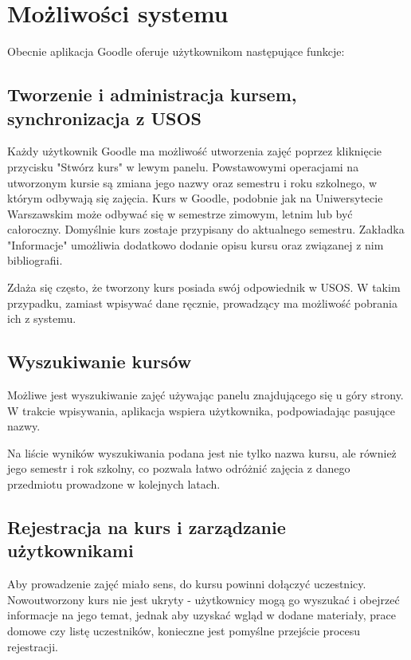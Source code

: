 \documentclass{pracamgr}
\begin{document}
%
%
\chapter{Możliwości systemu}

Obecnie aplikacja Goodle oferuje użytkownikom następujące funkcje:

\section{Tworzenie i administracja kursem, synchronizacja z USOS}

Każdy użytkownik Goodle ma możliwość utworzenia zajęć poprzez kliknięcie
przycisku "Stwórz kurs" w lewym panelu. Powstawowymi operacjami na 
utworzonym kursie są zmiana jego nazwy oraz semestru i roku szkolnego, 
w którym odbywają się zajęcia. Kurs w Goodle, podobnie jak na Uniwersytecie
Warszawskim może odbywać się w semestrze zimowym, letnim lub być całoroczny.
Domyślnie kurs zostaje przypisany do aktualnego semestru.
Zakładka "Informacje" umożliwia dodatkowo dodanie opisu kursu oraz związanej
z nim bibliografii.

Zdaża się często, że tworzony kurs posiada swój odpowiednik w USOS. W takim
przypadku, zamiast wpisywać dane ręcznie, prowadzący ma możliwość pobrania
ich z systemu.

\section{Wyszukiwanie kursów}

Możliwe jest wyszukiwanie zajęć używając panelu znajdującego
się u góry strony. W trakcie wpisywania, aplikacja wspiera użytkownika,
podpowiadając pasujące nazwy. 

Na liście wyników wyszukiwania podana jest nie tylko nazwa kursu, 
ale również jego semestr i rok szkolny, co pozwala łatwo odróżnić zajęcia z 
danego przedmiotu prowadzone w kolejnych latach.  

\section{Rejestracja na kurs i zarządzanie użytkownikami}

Aby prowadzenie zajęć miało sens, do kursu powinni dołączyć uczestnicy. 
Nowoutworzony kurs nie jest ukryty - użytkownicy mogą go wyszukać i obejrzeć
informacje na jego temat, jednak aby uzyskać wgląd w dodane materiały, prace
domowe czy listę uczestników, konieczne jest pomyślne przejście procesu 
rejestracji.
\end{document}
